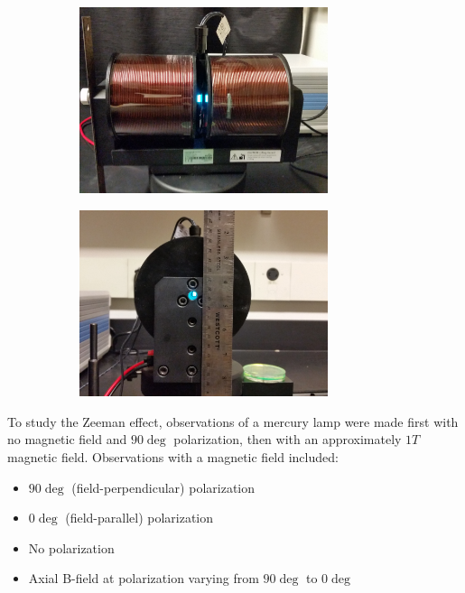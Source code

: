 \documentclass[twocolumn]{article}
\begin{document}
	\begin{figure}
		\centering
		\begin{subfigure}{0.5\textwidth}
			\includegraphics[width = 0.8\textwidth]{Images/PerpendicularView.jpg}
		\end{subfigure}%
		\begin{subfigure}{0.5\textwidth}
			\includegraphics[width = 0.8\textwidth]{Images/AxialView.jpg}
		\end{subfigure}%
	\end{figure}
	
	
	
	To study the Zeeman effect, observations of a mercury lamp were made first with no magnetic field and $90\deg$ polarization, then with an approximately $1T$ magnetic field.
	Observations with a magnetic field included:
	\begin{itemize}
		\item $90\deg$ (field-perpendicular) polarization
		\item $0\deg$ (field-parallel) polarization 
		\item No polarization
		\item Axial B-field at polarization varying from $90\deg$ to $0\deg$
	\end{itemize}
	
\end{document}
